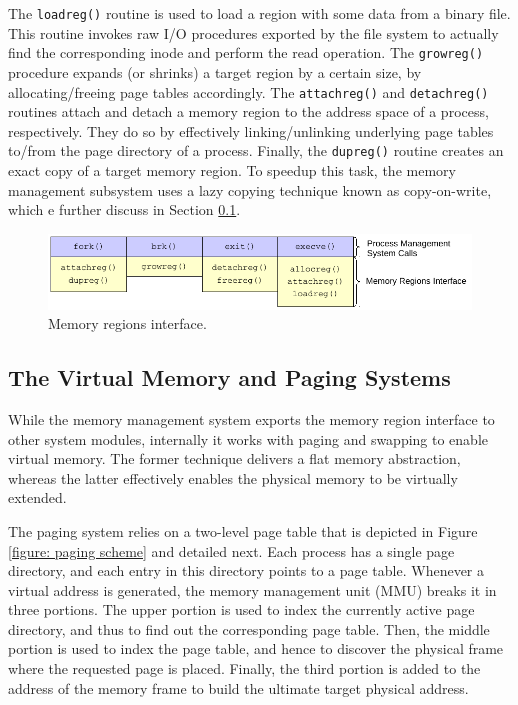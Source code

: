 	The \texttt{loadreg()} routine is used to load a region with some
	data from a binary file. This routine invokes raw I/O procedures
	exported by the file system to actually find the corresponding inode
	and perform the read operation. The \texttt{growreg()} procedure
	expands (or shrinks) a target region by a certain size, by
	allocating/freeing page tables accordingly. The \texttt{attachreg()}
	and \texttt{detachreg()} routines attach and detach a memory region
	to the address space of a process, respectively. They do so by
	effectively linking/unlinking underlying page tables to/from the
	page directory of a process. Finally, the \texttt{dupreg()} routine
	creates an exact copy of a target memory region. To speedup this
	task, the memory management subsystem uses a lazy copying technique
	known as copy-on-write, which e further discuss in Section
	\ref{subsection: the virtual memory and paging systems}.

	\begin{figure}[!t]
		\centering
		\includegraphics[scale=0.8]{img/memory-regions-interface}
		\caption{Memory regions interface.}
		\label{figure: memory regions interface}
	\end{figure}

\subsection{The Virtual Memory and Paging Systems}
\label{subsection: the virtual memory and paging systems}

	While the memory management system exports the memory region
	interface to other system modules, internally it works with paging
	and swapping to enable virtual memory. The former technique delivers
	a flat memory abstraction, whereas the latter effectively enables
	the physical memory to be virtually extended.

	The paging system relies on a two-level page table that is depicted
	in Figure \ref{figure: paging scheme} and detailed next. Each
	process has a single page directory, and each entry in this
	directory points to a page table. Whenever a virtual address is
	generated, the memory management unit (MMU) breaks it in three
	portions. The upper portion is used to index the currently active
	page directory, and thus to find out the corresponding page table.
	Then, the middle portion is used to index the page table, and hence
	to discover the physical frame where the requested page is placed.
	Finally, the third portion is added to the address of the memory
	frame to build the ultimate target physical address.

